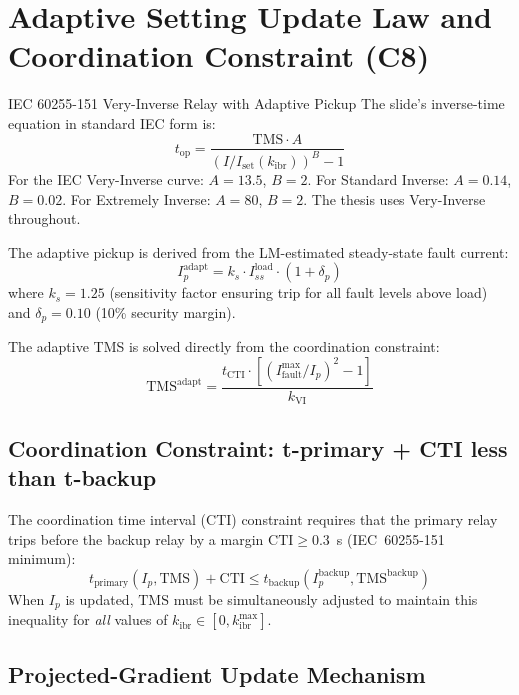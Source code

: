 \documentclass[12pt,a4paper]{article}
\newcommand{\kibr}{k_\mathrm{ibr}}
\newcommand{\TMS}{\mathrm{TMS}}
\newcommand{\Iset}{I_\mathrm{set}}
\newcommand{\Ip}{I_p}
\newcommand{\tops}{t_\mathrm{op}}
\newcommand{\tpri}{t_\mathrm{primary}}
\newcommand{\tbak}{t_\mathrm{backup}}
\newcommand{\CTI}{\mathrm{CTI}}
\begin{document}
\section{Adaptive Setting Update Law and Coordination Constraint (C8)}

\begin{formulabox}{IEC 60255-151 Very-Inverse Relay with Adaptive Pickup}
The slide's inverse-time equation in standard IEC form is:
\begin{equation}
  \tops = \frac{\TMS \cdot A}{\left(I/\Iset(\kibr)\right)^B - 1}
  \label{eq:toc}
\end{equation}
For the IEC Very-Inverse curve: $A = 13.5$, $B = 2$. For Standard Inverse: $A = 0.14$, $B = 0.02$. For Extremely Inverse: $A = 80$, $B = 2$. The thesis uses Very-Inverse throughout.

The adaptive pickup is derived from the LM-estimated steady-state fault current:
\begin{equation}
  \Ip^\mathrm{adapt} = k_s \cdot I_{ss}^\mathrm{load} \cdot (1 + \delta_p)
  \label{eq:ip_adapt}
\end{equation}
where $k_s = 1.25$ (sensitivity factor ensuring trip for all fault levels above load) and $\delta_p = 0.10$ (10\% security margin).

The adaptive TMS is solved directly from the coordination constraint:
\begin{equation}
  \TMS^\mathrm{adapt} = \frac{t_\mathrm{CTI} \cdot [(I_\mathrm{fault}^\mathrm{max}/\Ip)^2 - 1]}{k_\mathrm{VI}}
  \label{eq:tms_adapt}
\end{equation}
\end{formulabox}

\subsection{Coordination Constraint: t-primary + CTI less than t-backup}

The coordination time interval (CTI) constraint requires that the primary relay trips before the backup relay by a margin $\CTI \geq 0.3$~s (IEC~60255-151 minimum):
\[
  \tpri(\Ip, \TMS) + \CTI \leq \tbak(\Ip^\mathrm{backup}, \TMS^\mathrm{backup})
\]
When $\Ip$ is updated, $\TMS$ must be simultaneously adjusted to maintain this inequality for \emph{all} values of $\kibr \in [0, \kibr^\mathrm{max}]$.

\subsection{Projected-Gradient Update Mechanism}
\end{document}
